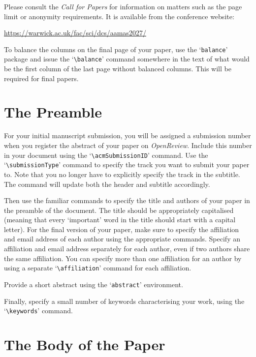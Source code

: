 \documentclass[sigconf,anonymous]{aamas}
\begin{document}
Please consult the \emph{Call for Papers} for information on matters 
such as the page limit or anonymity requirements. It is available from
the conference website:
%
\begin{center}
\url{https://warwick.ac.uk/fac/sci/dcs/aamas2027/}
\end{center}
%
To balance the columns on the final page of your paper, use the 
`\texttt{balance}' package and issue the `\verb|\balance|' command
 somewhere in the text of what would be the first column of the last 
 page without balanced columns. This will be required for final papers.


\section{The Preamble}

For your initial manuscript submission, you will be assigned a submission number when you register the abstract 
of your paper on \textit{OpenReview}. Include this number in your 
document using the `\verb|\acmSubmissionID|' command.
Use the `\verb|\submissionType|' command to specify the track you want to 
submit your paper to. Note that you no longer have to explicitly specify the track in 
the subtitle. The command will update both the header and subtitle accordingly.

Then use the familiar commands to specify the title and authors of your
paper in the preamble of the document. The title should be appropriately 
capitalised (meaning that every `important' word in the title should 
start with a capital letter). For the final version of your paper, make 
sure to specify the affiliation and email address of each author using 
the appropriate commands. Specify an affiliation and email address 
separately for each author, even if two authors share the same 
affiliation. You can specify more than one affiliation for an author by 
using a separate `\verb|\affiliation|' command for each affiliation.

Provide a short abstract using the `\texttt{abstract}' environment.
 
Finally, specify a small number of keywords characterising your work, 
using the `\verb|\keywords|' command. 


\section{The Body of the Paper}
\end{document}
